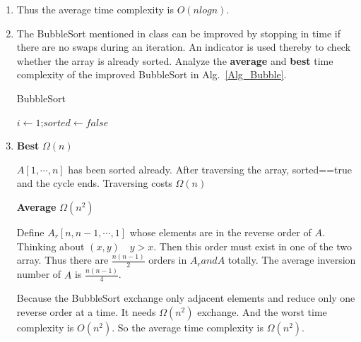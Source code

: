 \documentclass[12pt,a4paper]{article}
\makeatletter
\newtheorem*{solution}{Solution}
\theoremstyle{definition}
\renewenvironment{solution}[1][Solution] {\par\pushQED{\qed}\normalfont\topsep6\p@\@plus6\p@\relax\trivlist\item[\hskip\labelsep\bfseries#1\@addpunct{.}]\ignorespaces}{\popQED\endtrivlist\@endpefalse} \makeatother
\makeatother
\begin{document}
\begin{enumerate}
\begin{solution}
    Thus the average time complexity is $O(nlogn)$.

   \end{solution}

    \item
    The BubbleSort mentioned in class can be improved by stopping in time if there are no swaps during an iteration. An indicator is used thereby to check whether the array is already sorted. Analyze the \textbf{average} and \textbf{best} time complexity of the improved BubbleSort in Alg.~\ref{Alg_Bubble}.

    \begin{minipage}[t]{0.8\textwidth}
    \begin{algorithm}[H]

        \BlankLine
        \caption{BubbleSort}\label{Alg_Bubble}

        $i\leftarrow 1$;$sorted\leftarrow false$\;

    \end{algorithm}
    \end{minipage}

   \begin{solution}
        \textbf{Best} $\Omega (n)$

        $A[1,\cdots,n]$ has been sorted already. After traversing the array, sorted==true and the cycle ends.
        Traversing costs $\Omega (n)$
        
        \textbf{Average} $\Omega (n^2)$

        Define $A_r[n,n-1,\cdots,1]$ whose elements are in the reverse order of $A$.
        Thinking about $(x,y) \quad y>x$. Then this order must exist in one of the two array.
        Thus there are $\frac{n(n-1)}{2}$ orders in $A_r and A$ totally.
        The average inversion number of $A$ is $\frac{n(n-1)}{4}$.

        Because the BubbleSort exchange only adjacent elements and reduce only one reverse order at a time.
        It needs $\Omega(n^2)$ exchange. And the worst time complexity is $O(n^2)$. So the average time complexity is $\Omega(n^2)$.
        



\end{solution}
\end{enumerate}
\end{document}
